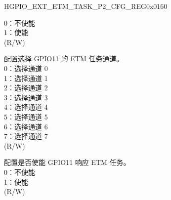 \begin{register}{H}{GPIO\_EXT\_ETM\_TASK\_P2\_CFG\_REG}{0x0160}
\begin{regdesc}
\begin{reglist}
0：不使能\\
1：使能\\ (R/W)
\label{fielddesc:GPIOEXTETMTASKGPIO11SEL}\item [GPIO\_EXT\_ETM\_TASK\_GPIO11\_SEL] 配置选择 GPIO11 的 ETM 任务通道。\\
0：选择通道 0\\
1：选择通道 1\\
2：选择通道 2\\
3：选择通道 3\\
4：选择通道 4\\
5：选择通道 5\\
6：选择通道 6\\
7：选择通道 7\\ (R/W) 
\label{fielddesc:GPIOEXTETMTASKGPIO11EN}\item [GPIO\_EXT\_ETM\_TASK\_GPIO11\_EN] 配置是否使能 GPIO11 响应 ETM 任务。\\
0：不使能\\
1：使能\\ (R/W)
\item [见下页]
\end{reglist}\end{regdesc}
\end{register}

